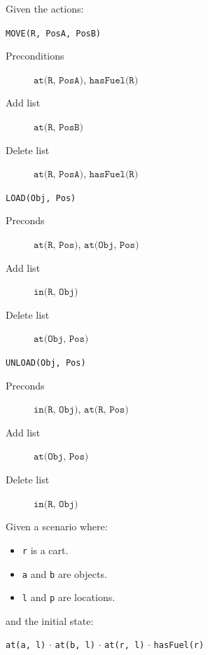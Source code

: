 \begin{example}
    Given the actions:
    \begin{descriptionlist}
        \item[\texttt{MOVE(R, PosA, PosB)}] \phantom{}
            \begin{description}
                \item[Preconditions] $\texttt{at(R, PosA)}$, $\texttt{hasFuel(R)}$
                \item[Add list] $\texttt{at(R, PosB)}$
                \item[Delete list] $\texttt{at(R, PosA)}$, $\texttt{hasFuel(R)}$
            \end{description}
    \end{descriptionlist}

    \begin{minipage}{0.5\textwidth}
        \begin{descriptionlist}
            \item[\texttt{LOAD(Obj, Pos)}] \phantom{}
                \begin{description}
                    \item[Preconds] $\texttt{at(R, Pos)}$, $\texttt{at(Obj, Pos)}$
                    \item[Add list] $\texttt{in(R, Obj)}$
                    \item[Delete list] $\texttt{at(Obj, Pos)}$
                \end{description}
        \end{descriptionlist}
    \end{minipage}
    \begin{minipage}{0.5\textwidth}
        \begin{descriptionlist}
            \item[\texttt{UNLOAD(Obj, Pos)}] \phantom{}
                \begin{description}
                    \item[Preconds] $\texttt{in(R, Obj)}$, $\texttt{at(R, Pos)}$
                    \item[Add list] $\texttt{at(Obj, Pos)}$
                    \item[Delete list] $\texttt{in(R, Obj)}$
                \end{description}
        \end{descriptionlist}
    \end{minipage}

    Given a scenario where:
    \begin{itemize}
        \item \texttt{r} is a cart.
        \item \texttt{a} and \texttt{b} are objects.
        \item \texttt{l} and \texttt{p} are locations.
    \end{itemize}
    and the initial state:
    \begin{center}
        \texttt{at(a, l)} $\cdot$ \texttt{at(b, l)} $\cdot$ \texttt{at(r, l)} $\cdot$ \texttt{hasFuel(r)} 
    \end{center}


\end{example}
